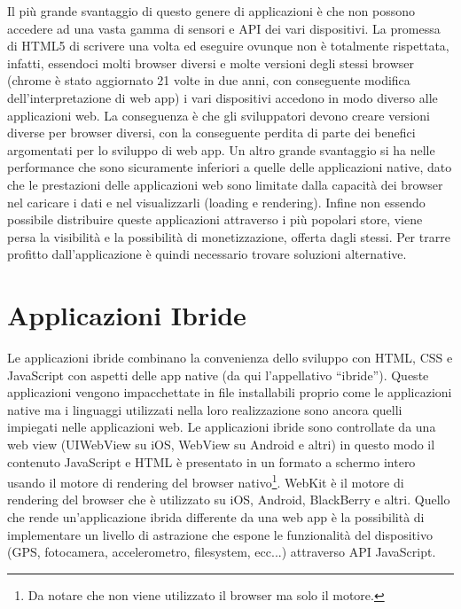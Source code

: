         Il più grande svantaggio di questo genere di applicazioni è che non
        possono accedere ad una vasta gamma di sensori e API dei vari
        dispositivi. La promessa di HTML5 di scrivere una volta ed eseguire
        ovunque non è totalmente rispettata, infatti, essendoci molti browser
        diversi e molte versioni degli stessi browser (chrome è stato aggiornato
        21 volte in due anni, con conseguente modifica dell'interpretazione di
        web app\citep{White:Native-vs-Html}) i vari dispositivi accedono in modo
        diverso alle applicazioni web. La conseguenza è che gli sviluppatori
        devono creare versioni diverse per browser diversi, con la conseguente
        perdita di parte dei benefici argomentati per lo sviluppo di web app. Un
        altro grande svantaggio si ha nelle performance che sono sicuramente
        inferiori a quelle delle applicazioni native, dato che le prestazioni
        delle applicazioni web sono limitate dalla capacità dei browser nel
        caricare i dati e nel visualizzarli (loading e rendering). Infine non
        essendo possibile distribuire queste applicazioni attraverso i più
        popolari store, viene persa la visibilità e la possibilità di
        monetizzazione, offerta dagli stessi. Per trarre profitto
        dall'applicazione è quindi necessario trovare soluzioni alternative.

    \section{Applicazioni Ibride}
        Le applicazioni ibride combinano la convenienza dello sviluppo con HTML,
        CSS e JavaScript con aspetti delle app native (da qui l'appellativo
        ``ibride''). Queste applicazioni vengono impacchettate in file
        installabili proprio come le applicazioni native ma i linguaggi
        utilizzati nella loro realizzazione sono ancora quelli impiegati nelle
        applicazioni web. Le applicazioni ibride sono controllate da una web
        view (UIWebView su iOS, WebView su Android e altri) in questo modo il
        contenuto JavaScript e HTML è  presentato in un formato a schermo
        intero usando il motore di rendering del browser nativo\footnote{Da
        notare che non viene utilizzato il browser ma solo il motore.}. WebKit è
        il motore di rendering del browser che è utilizzato su iOS, Android,
        BlackBerry e altri. Quello che rende un'applicazione ibrida differente
        da una web app è la possibilità di implementare un livello di astrazione
        che espone le funzionalità del dispositivo (GPS, fotocamera,
        accelerometro, filesystem, ecc...) attraverso API JavaScript.

